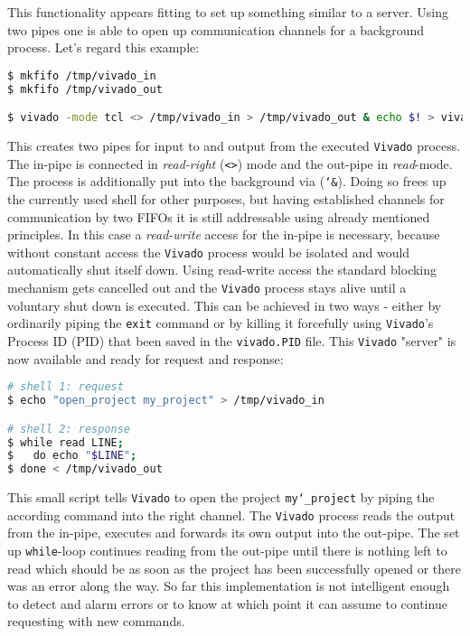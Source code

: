 This functionality appears fitting to set up something similar to a server. Using two pipes one is able to open up communication channels for a background process. Let's regard this example:
\begin{lstlisting}[language=bash]
$ mkfifo /tmp/vivado_in
$ mkfifo /tmp/vivado_out

$ vivado -mode tcl <> /tmp/vivado_in > /tmp/vivado_out & echo $! > vivado.PID
\end{lstlisting}
\noindent
This creates two pipes for input to and output from the executed \texttt{Vivado} process. The in-pipe is connected in \textit{read-right} (\texttt{<>}) mode and the out-pipe in \textit{read}-mode. The process is additionally put into the background via (\texttt{\char`&}). Doing so frees up the currently used shell for other purposes, but having established channels for communication by two \acs{FIFO}s it is still addressable using already mentioned principles. In this case a \textit{read-write} access for the in-pipe is necessary, because without constant access the \texttt{Vivado} process would be isolated and would automatically shut itself down. Using read-write access the standard blocking mechanism gets cancelled out and the \texttt{Vivado} process stays alive until a voluntary shut down is executed. This can be achieved in two ways - either by ordinarily piping the \texttt{exit} command or by killing it forcefully using \texttt{Vivado}'s Process ID (PID) that been saved in the \texttt{vivado.PID} file. This \texttt{Vivado} "server" is now available and ready for request and response:

\begin{lstlisting}[language=bash]
# shell 1: request
$ echo "open_project my_project" > /tmp/vivado_in

# shell 2: response
$ while read LINE;
$ 	do echo "$LINE";
$ done < /tmp/vivado_out	
\end{lstlisting}
\noindent
This small script tells \texttt{Vivado} to open the project \texttt{my\char`_project} by piping the according command into the right channel. The \texttt{Vivado} process reads the output from the in-pipe, executes and forwards its own output into the out-pipe. The set up \texttt{while}-loop continues reading from the out-pipe until there is nothing left to read which should be as soon as the project has been successfully opened or there was an error along the way. So far this implementation is not intelligent enough to detect and alarm errors or to know at which point it can assume to continue requesting with new commands.

